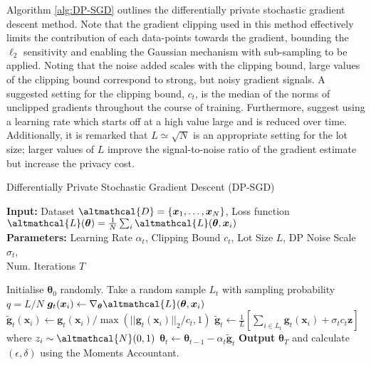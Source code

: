 Algorithm \ref{alg:DP-SGD} outlines the differentially private stochastic gradient descent method. Note that the gradient clipping used in this method effectively limits the contribution of each data-points towards the gradient, bounding the $\ell_2$ sensitivity and enabling the Gaussian mechanism with sub-sampling to be applied. Noting that the noise added scales with the clipping bound, large values of the clipping bound correspond to strong, but noisy gradient signals. A suggested setting for the clipping bound, $c_t$, is the median of the norms of unclipped gradients throughout the course of training. Furthermore, \citeauthor{moments_account} suggest using a learning rate which starts off at a high value large and is reduced over time. Additionally, it is remarked that $L \simeq \sqrt{N}$ is an appropriate setting for the lot size; larger values of $L$ improve the signal-to-noise ratio of the gradient estimate but increase the privacy cost. 

\begin{algorithm}
	\caption{Differentially Private Stochastic Gradient Descent (DP-SGD)}
	\label{alg:DP-SGD}
	\hspace*{\algorithmicindent} \textbf{Input:} Dataset $\altmathcal{D} = \lbrace \bm{x}_1, \ldots, \bm{x}_N \rbrace$, Loss function $\altmathcal{L}(\bm{\theta}) = \frac{1}{N} \sum_i \altmathcal{L}(\bm{\theta}, \bm{x}_i)$ \\
	\hspace*{\algorithmicindent} \textbf{Parameters:} Learning Rate $\alpha_t$, Clipping Bound $c_t$, Lot Size $L$, DP Noise Scale $\sigma_t$, \\ 	\hspace*{\algorithmicindent} Num. Iterations $T$ 
	\begin{algorithmic}[1] %
		\State Initialise $\bm{\theta}_0$ randomly. 
		\State Take a random sample $L_t$ with sampling probability $q = L / N$
		 
		\State $\bm{g}_t(\bm{x}_i) \leftarrow \nabla_{\bm{\theta}} \altmathcal{L}(\bm{\theta}, \bm{x}_i)$
		\State $\tilde{\bm{g}}_t(\bm{x}_i) \leftarrow \bm{g}_t(\bm{x}_i) / \max(||\bm{g}_t(\bm{x}_i)||_2/c_t, 1)$ 
		\EndFor
				\State $\tilde{\bm{g}}_t \leftarrow \frac{1}{L} [\sum_{i \in L_t} \bm{g}_t(\bm{x}_i) + \sigma_t c_t \bm{z}]$ where $z_i \sim \altmathcal{N}(0, 1)$ 
				\State $\bm{\theta}_t \leftarrow \bm{\theta}_{t-1} - \alpha_t \tilde{\bm{g}}_t$
		\EndFor
		\State \textbf{Output} $\bm{\theta}_T$ and calculate $(\epsilon, \delta)$ using the Moments Accountant. 
	\end{algorithmic}
\end{algorithm}


